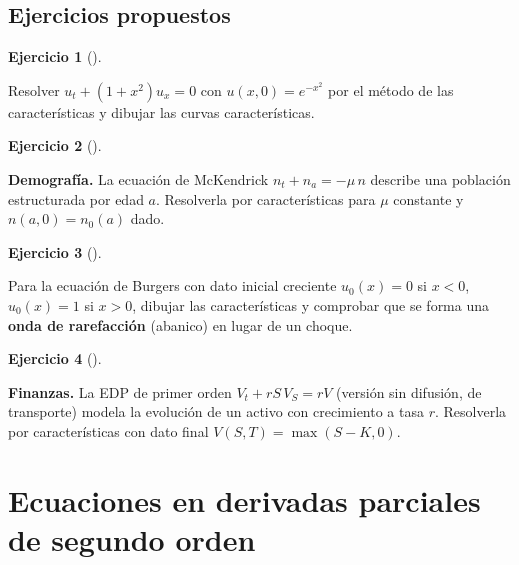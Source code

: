 \documentclass[
  spanish,
  a4paper,
]{scrreport}
\theoremstyle{definition}
\newtheorem{exercise}{Ejercicio}[chapter]
\theoremstyle{remark}
\begin{document}
\section{Ejercicios propuestos}\label{ejercicios-propuestos-6}

\begin{exercise}[]\protect\hypertarget{exr-propuesto-transporte-var}{}\label{exr-propuesto-transporte-var}

Resolver \(u_t + (1 + x^2)u_x = 0\) con \(u(x,0) = e^{-x^2}\) por el
método de las características y dibujar las curvas características.

\end{exercise}

\begin{exercise}[]\protect\hypertarget{exr-propuesto-poblacion-edad}{}\label{exr-propuesto-poblacion-edad}

\textbf{Demografía.} La ecuación de McKendrick \(n_t + n_a = -\mu\, n\)
describe una población estructurada por edad \(a\). Resolverla por
características para \(\mu\) constante y \(n(a, 0) = n_0(a)\) dado.

\end{exercise}

\begin{exercise}[]\protect\hypertarget{exr-propuesto-rarefaccion}{}\label{exr-propuesto-rarefaccion}

Para la ecuación de Burgers con dato inicial creciente \(u_0(x) = 0\) si
\(x<0\), \(u_0(x)=1\) si \(x>0\), dibujar las características y
comprobar que se forma una \textbf{onda de rarefacción} (abanico) en
lugar de un choque.

\end{exercise}

\begin{exercise}[]\protect\hypertarget{exr-propuesto-precios}{}\label{exr-propuesto-precios}

\textbf{Finanzas.} La EDP de primer orden \(V_t + rS\,V_S = rV\)
(versión sin difusión, de transporte) modela la evolución de un activo
con crecimiento a tasa \(r\). Resolverla por características con dato
final \(V(S, T) = \max(S - K, 0)\).

\end{exercise}


\chapter{Ecuaciones en derivadas parciales de segundo
orden}\label{ecuaciones-en-derivadas-parciales-de-segundo-orden}
\end{document}
